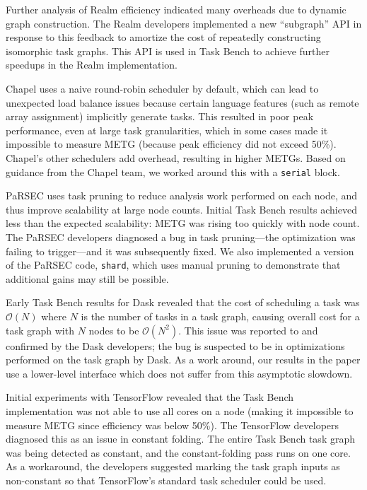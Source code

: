 {\color{blue}
Further analysis of Realm efficiency indicated many overheads due to
dynamic graph construction. The Realm developers implemented a new
``subgraph'' API in response to this feedback to amortize the cost of
repeatedly constructing isomorphic task graphs. This API is used in
Task Bench to achieve further speedups in the Realm implementation.

Chapel uses a naive round-robin scheduler by default, which can lead
to unexpected load balance issues because certain language features
(such as remote array assignment) implicitly generate tasks. This
resulted in poor peak performance, even at large task granularities,
which in some cases made it impossible to measure METG (because peak
efficiency did not exceed 50\%). Chapel's other schedulers add
overhead, resulting in higher METGs. Based on guidance from the Chapel team, we worked around this with
a \lstinline{serial} block.

PaRSEC uses task pruning to reduce analysis work performed on each
node, and thus improve scalability at large node
counts. Initial Task Bench results achieved less than the expected
scalability: METG was rising too quickly with node count.  The PaRSEC
developers diagnosed a bug in task pruning---the optimization was failing to trigger---and it was
subsequently fixed. We also implemented a version of the PaRSEC code,
\lstinline{shard}, which uses manual pruning to demonstrate that
additional gains may still be possible.

Early Task Bench results for Dask revealed that the cost of scheduling
a task was $\mathcal{O}(N)$ where $N$ is the number of tasks in a task
graph, causing overall cost for a task graph with $N$ nodes to be
$\mathcal{O}(N^2)$. This issue was reported to and confirmed by the
Dask developers; the bug is suspected to be in optimizations performed
on the task graph by Dask. As a work around, our results in the paper use a
lower-level interface which does not suffer from this asymptotic
slowdown.

Initial experiments with TensorFlow revealed that the Task
Bench implementation was not able to use all cores on a node (making it impossible to measure METG since efficiency was below
50\%). The TensorFlow developers diagnosed this as an issue in
constant folding. The entire Task Bench task graph was being detected
as constant, and the constant-folding pass runs on one core. As a
workaround, the developers suggested marking the task graph inputs as
non-constant so that TensorFlow's standard task scheduler could be
used.

}
